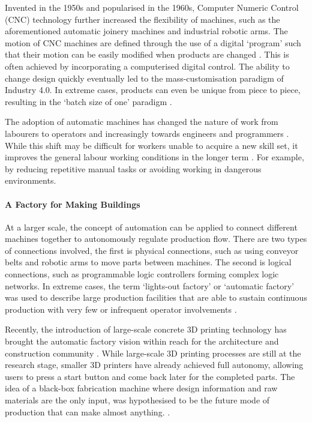 Invented in the 1950s and popularised in the 1960s, Computer Numeric Control (CNC) technology further increased the flexibility of machines, such as the aforementioned automatic joinery machines and industrial robotic arms. The motion of CNC machines are defined through the use of a digital ‘program’ such that their motion can be easily modified when products are changed \parencite{wardAutomaticProgrammingNumerically1959}. This is often achieved by incorporating a computerised digital control. The ability to change design quickly eventually led to the mass-customisation paradigm of Industry 4.0. In extreme cases, products can even be unique from piece to piece, resulting in the ‘batch size of one’ paradigm \parencite{wardAutomaticProgrammingNumerically1959}.

The adoption of automatic machines has changed the nature of work from labourers to operators and increasingly towards engineers and programmers \parencite{nobleForcesProductionSocial1986}. While this shift may be difficult for workers unable to acquire a new skill set, it improves the general labour working conditions in the longer term \parencite{stromquistWorldDevelopmentReport2019}. For example, by reducing repetitive manual tasks or avoiding working in dangerous environments. 

\paragraph{A Factory for Making Buildings}

\label{subsubsection:introduction-a-factory-for-making-buildings}

At a larger scale, the concept of automation can be applied to connect different machines together to autonomously regulate production flow. There are two types of connections involved, the first is physical connections, such as using conveyor belts and robotic arms to move parts between machines. The second is logical connections, such as programmable logic controllers forming complex logic networks. In extreme cases, the term ‘lights-out factory’ or ‘automatic factory’ was used to describe large production facilities that are able to sustain continuous production with very few or infrequent operator involvements \parencite{nobleForcesProductionSocial1986,walkerAutomaticFactoryCase1957}. 

Recently, the introduction of large-scale concrete 3D printing technology has brought the automatic factory vision within reach for the architecture and construction community \parencite{ngoAdditiveManufacturing3D2018}. While large-scale 3D printing processes are still at the research stage, smaller 3D printers have already achieved full autonomy, allowing users to press a start button and come back later for the completed parts. The idea of a black-box fabrication machine where design information and raw materials are the only input, was hypothesised to be the future mode of production that can make almost anything.\parencite{gershenfeldHowMakeAlmost2012, gershenfeldInternetThings2004} .  

